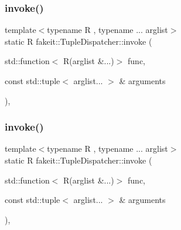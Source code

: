 \mbox{\label{structfakeit_1_1TupleDispatcher_a279619fd6d6649c4d99c459a3286469a}} 
\subsubsection{\texorpdfstring{invoke()}{invoke()}\hspace{0.1cm}{\footnotesize\ttfamily [5/9]}}
{\footnotesize\ttfamily template$<$typename R , typename ... arglist$>$ \\
static R fakeit\+::\+Tuple\+Dispatcher\+::invoke (\begin{DoxyParamCaption}\item[{std\+::function$<$ R(arglist \&...)$>$}]{func,  }\item[{const std\+::tuple$<$ arglist... $>$ \&}]{arguments }\end{DoxyParamCaption})\hspace{0.3cm}{\ttfamily [inline]}, {\ttfamily [static]}}

\mbox{\label{structfakeit_1_1TupleDispatcher_a279619fd6d6649c4d99c459a3286469a}} 
\subsubsection{\texorpdfstring{invoke()}{invoke()}\hspace{0.1cm}{\footnotesize\ttfamily [6/9]}}
{\footnotesize\ttfamily template$<$typename R , typename ... arglist$>$ \\
static R fakeit\+::\+Tuple\+Dispatcher\+::invoke (\begin{DoxyParamCaption}\item[{std\+::function$<$ R(arglist \&...)$>$}]{func,  }\item[{const std\+::tuple$<$ arglist... $>$ \&}]{arguments }\end{DoxyParamCaption})\hspace{0.3cm}{\ttfamily [inline]}, {\ttfamily [static]}}

\mbox{\label{structfakeit_1_1TupleDispatcher_a279619fd6d6649c4d99c459a3286469a}} 

